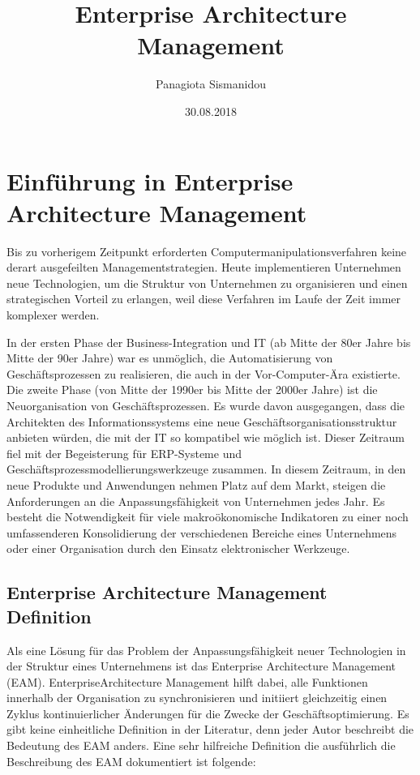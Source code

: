 \documentclass[
	A4paper,
	DIV=9,
	BCOR7mm,
	smallheadings,
	headinclude,
	footinclude,
	headsepline,
	parindent,
	german,
	captions=tableheading,
	abstracton
	]{scrreprt}
\title{Enterprise Architecture Management}
\author{Panagiota Sismanidou}
\date{30.08.2018}
\begin{document}
\maketitle
\tableofcontents




\chapter{Einführung in Enterprise Architecture Management}

Bis zu vorherigem Zeitpunkt erforderten Computermanipulationsverfahren keine derart ausgefeilten Managementstrategien. Heute implementieren Unternehmen neue Technologien, um die Struktur von Unternehmen zu organisieren und einen strategischen Vorteil zu erlangen, weil diese Verfahren im Laufe der Zeit immer komplexer werden.

In der ersten Phase der Business-Integration und IT (ab Mitte der 80er Jahre bis Mitte der 90er Jahre) war es unmöglich, die Automatisierung von Geschäftsprozessen zu realisieren, die auch in der Vor-Computer-Ära existierte. Die zweite Phase (von Mitte der 1990er bis Mitte der 2000er Jahre) ist die Neuorganisation von Geschäftsprozessen. Es wurde davon ausgegangen, dass die Architekten des Informationssystems eine neue Geschäftsorganisationsstruktur anbieten würden, die mit der IT so kompatibel wie möglich ist. Dieser Zeitraum fiel mit der Begeisterung für ERP-Systeme und Geschäftsprozessmodellierungswerkzeuge zusammen. In diesem Zeitraum, in den neue Produkte und Anwendungen  nehmen Platz auf dem Markt, steigen die Anforderungen an die Anpassungsfähigkeit von Unternehmen jedes Jahr. Es besteht die Notwendigkeit für viele makroökonomische Indikatoren zu einer noch umfassenderen Konsolidierung der verschiedenen  Bereiche eines Unternehmens oder einer Organisation durch den Einsatz elektronischer Werkzeuge.

\section{Enterprise Architecture Management Definition}
Als eine Lösung für das Problem der Anpassungsfähigkeit neuer Technologien in der Struktur eines Unternehmens ist das Enterprise Architecture Management (EAM). EnterpriseArchitecture Management hilft dabei, alle Funktionen innerhalb der Organisation zu synchronisieren und initiiert gleichzeitig einen Zyklus kontinuierlicher Änderungen für die Zwecke der Geschäftsoptimierung. Es gibt keine einheitliche Definition in der Literatur, denn jeder Autor beschreibt die Bedeutung des EAM anders. Eine sehr hilfreiche Definition die ausführlich die Beschreibung des EAM dokumentiert ist folgende:
\end{document}
